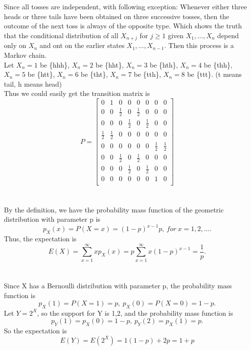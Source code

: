 \documentclass[10.5pt]{article}
\begin{document}
\section{}
Since all tosses are independent, with following exception: Whenever either three heads or three tails have been obtained on three successive tosses, then the outcome of the next toss is always of the opposite type. Which shows the truth that the conditional distribution of all $X_{n+j}$ for $j\geqslant 1$ given $X_1,\dots,X_n$ depend only on $X_n$ and ont on the earlier states $X_1,\dots,X_{n-1}$. Then this process is a Markov chain.\\\indent
Let $X_n=1$ be \{hhh\}, $X_n=2$ be \{hht\}, $X_n=3$ be \{hth\}, $X_n=4$ be \{thh\}, $X_n=5$ be \{htt\}, $X_n=6$ be \{tht\}, $X_n=7$ be \{tth\}, $X_n=8$ be \{ttt\}. (t means tail, h means head)\\\indent
Thus we could easily get the transition matrix is $$P = \begin{bmatrix}
    0 & 1 & 0 & 0 & 0 & 0 & 0 & 0\\
    0 & 0 & \frac{1}{2} & 0 & \frac{1}{2} & 0 & 0 & 0\\
    0 & 0 & 0 & \frac{1}{2} & 0 & \frac{1}{2} & 0 & 0\\
    \frac{1}{2} & \frac{1}{2} & 0 & 0 & 0 & 0 & 0 & 0\\
    0 & 0 & 0 & 0 & 0 & 0 & \frac{1}{2} & \frac{1}{2}\\
    0 & 0 & \frac{1}{2} & 0 & \frac{1}{2} & 0 & 0 & 0\\
    0 & 0 & 0 & \frac{1}{2} & 0 & \frac{1}{2} & 0 & 0\\
    0 & 0 & 0 & 0 & 0 & 0 & 1 & 0\\
\end{bmatrix}$$

\section{}
By the definition, we have the probability mass function of the geometric distribution with parameter p is $$p_X(x) = P(X=x) = (1-p)^{x-1}p, ~for ~x=1,2,\dots.$$\indent
Thus, the expectation is $$E(X) = \sum_{x=1}^{\infty} xp_X(x) = p \sum_{x=1}^{\infty} x(1-p)^{x-1} = \frac{1}{p}.$$

\section{}
Since X has a Bernoulli distribution with parameter p, the probability mass function is $$p_X(1)=P(X=1)=p,~p_X(0)=P(X=0)=1-p.$$\indent
Let $Y=2^X$, so the support for Y is {1,2}, and the probability mass function is $$p_Y(1)=p_X(0)=1-p,~p_Y(2)=p_X(1)=p.$$\indent So the expectation is $$E(Y)=E(2^X)=1(1-p)+2p=1+p$$
\end{document}
